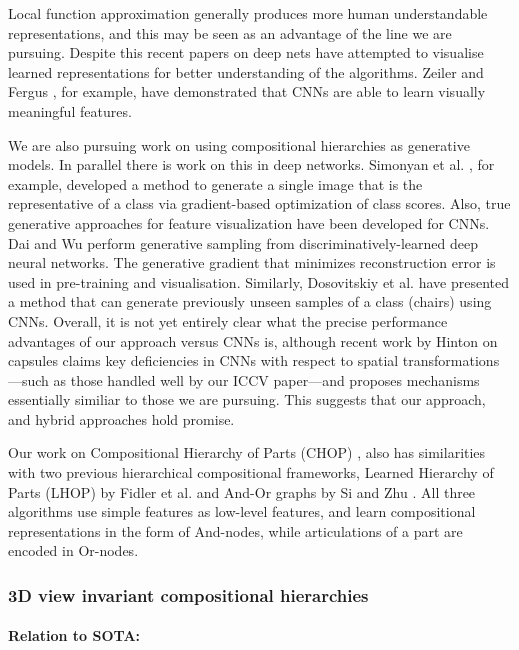 \documentclass[a4paper,11pt,pdf]{../templates/pacmanreport}
\begin{document}
Local function approximation generally produces more human understandable representations, and this may be seen as an advantage of the line we are pursuing. Despite this recent papers on deep nets \cite{deepvis,Simonyan14a,DBLP:journals/corr/MahendranV15,deepvis2} have attempted to visualise learned representations for better understanding of the algorithms. Zeiler and Fergus \cite{deepvis}, for example, have demonstrated that CNNs are able to learn visually meaningful features. 

We are also pursuing work on using compositional hierarchies as generative models. In parallel there is work on this in deep networks. Simonyan et al. \cite{Simonyan14a}, for example, developed a method to generate a single image that is the representative of a class via gradient-based optimization of class scores. Also, true generative approaches for feature visualization have been developed for CNNs. Dai and Wu \cite{DBLP:journals/corr/DaiW14} perform generative sampling from discriminatively-learned deep neural networks. The generative gradient that minimizes reconstruction error is used in pre-training and visualisation. Similarly, Dosovitskiy et al. \cite{DB15} have presented a method that can generate previously unseen samples of a class (chairs) using CNNs. Overall, it is not yet entirely clear what the precise performance advantages of our approach versus CNNs is, although recent work by Hinton on capsules claims key deficiencies in CNNs with respect to spatial transformations---such as those handled well by our ICCV paper---and proposes mechanisms essentially similiar to those we are pursuing. This suggests that our approach, and hybrid approaches hold promise.

Our work on Compositional Hierarchy of Parts (CHOP) \cite{chop,CHOPManifold}, also has similarities with two previous hierarchical compositional frameworks, Learned Hierarchy of Parts (LHOP) by Fidler et al. \cite{fidler_cvpr07,lhop_book} and And-Or graphs by Si and Zhu \cite{report:SCZhu}. All three algorithms use simple features as low-level features, and learn compositional representations in the form of And-nodes, while articulations of a part are encoded in Or-nodes. 

\subsubsection{3D view invariant compositional hierarchies}


\paragraph{Relation to SOTA:} 
\end{document}
